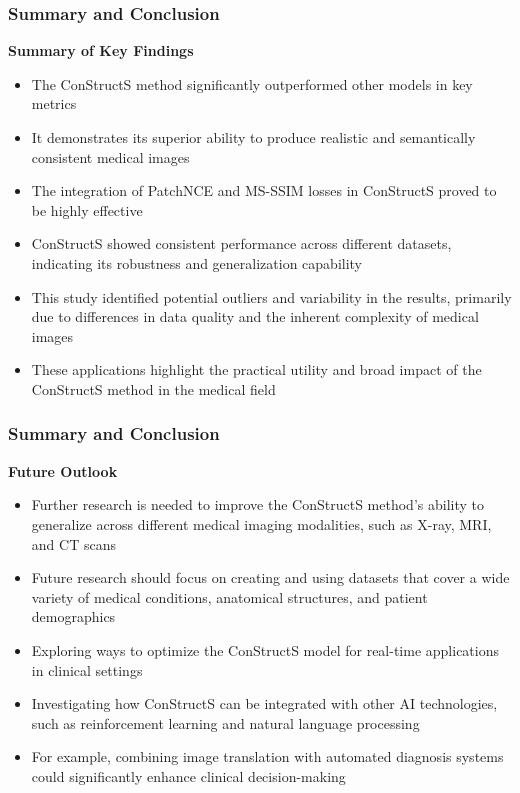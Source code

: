 \documentclass[aspectratio=169, lecture, amberg]{OTHAWbeamer}
\begin{document}
\begin{frame}
\frametitle{Summary and Conclusion}

\textbf{Summary of Key Findings}
\vspace{0.2cm}
\begin{itemize}
    \item <1-> The ConStructS method significantly outperformed other models in key metrics
    \vspace{0.2cm}
    \item <2-> It demonstrates its superior ability to produce realistic and semantically consistent medical images
    \vspace{0.2cm}
    \item <3-> The integration of PatchNCE and MS-SSIM losses in ConStructS proved to be highly effective
    \vspace{0.2cm}
    \item <4-> ConStructS showed consistent performance across different datasets, indicating its robustness and generalization capability
    \vspace{0.2cm}
    \item <5-> This study identified potential outliers and variability in the results, primarily due to differences in data quality and the inherent complexity of medical images
    \vspace{0.2cm}
    \item <6-> These applications highlight the practical utility and broad impact of the ConStructS method in the medical field
\end{itemize}
\end{frame}

\begin{frame}
    \frametitle{Summary and Conclusion}
    \textbf{Future Outlook}
    \vspace{0.2cm}
    \begin{itemize}
       \item <1-> Further research is needed to improve the ConStructS method's ability to generalize across different medical imaging modalities, such as X-ray, MRI, and CT scans
       \vspace{0.2cm}
       \item <2-> Future research should focus on creating and using datasets that cover a wide variety of medical conditions, anatomical structures, and patient demographics
       \vspace{0.2cm}
       \item <3-> Exploring ways to optimize the ConStructS model for real-time applications in clinical settings
       \vspace{0.2cm}
       \item <4-> Investigating how ConStructS can be integrated with other AI technologies, such as reinforcement learning and natural language processing
       \vspace{0.2cm}
       \item <5-> For example, combining image translation with automated diagnosis systems could significantly enhance clinical decision-making
    \end{itemize}
    \end{frame}
\end{document}
